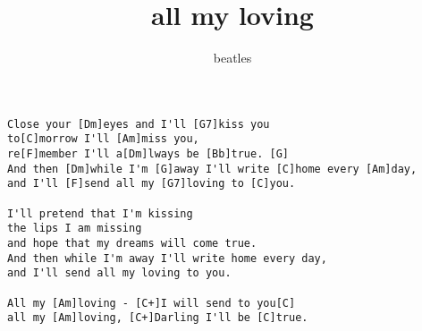 \author{beatles}
\title{all my loving}
\maketitle
\begin{verbatim}
Close your [Dm]eyes and I'll [G7]kiss you
to[C]morrow I'll [Am]miss you,
re[F]member I'll a[Dm]lways be [Bb]true. [G]
And then [Dm]while I'm [G]away I'll write [C]home every [Am]day,
and I'll [F]send all my [G7]loving to [C]you.

I'll pretend that I'm kissing
the lips I am missing
and hope that my dreams will come true.
And then while I'm away I'll write home every day,
and I'll send all my loving to you.

All my [Am]loving - [C+]I will send to you[C]
all my [Am]loving, [C+]Darling I'll be [C]true.
\end{verbatim}